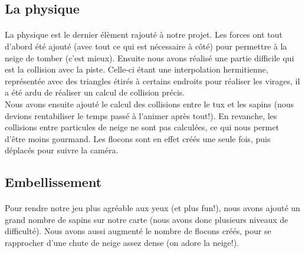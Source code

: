 \documentclass[11pt]{article}
\begin{document}
    \subsection{La physique}

    \paragraph{}
    La physique est le dernier élèment rajouté à notre projet.
    Les forces ont tout d'abord été ajouté (avec tout ce qui est nécessaire à côté) pour permettre à la neige de tomber (c'est mieux).
    Ensuite nous avons réalisé une partie difficile qui est la collision avec la piste.
    Celle-ci étant une interpolation hermitienne, représentée avec des triangles étirés à certains endroits pour réaliser les virages, il a été ardu de réaliser un calcul de collision précis.\\
    Nous avons ensuite ajouté le calcul des collisions entre le tux et les sapins (nous devions rentabiliser le temps passé à l'animer après tout!).
    En revanche, les collisions entre particules de neige ne sont pas calculées, ce qui nous permet d'être moins gourmand.
    Les flocons sont en effet créés une seule fois, puis déplacés pour suivre la caméra.

    \subsection{Embellissement}

    \paragraph{}
    Pour rendre notre jeu plus agréable aux yeux (et plus fun!), nous avons ajouté un grand nombre de sapins sur notre carte (nous avons donc plusieurs niveaux de difficulté).
    Nous avons aussi augmenté le nombre de flocons créés, pour se rapprocher d'une chute de neige assez dense (on adore la neige!).
\end{document}
